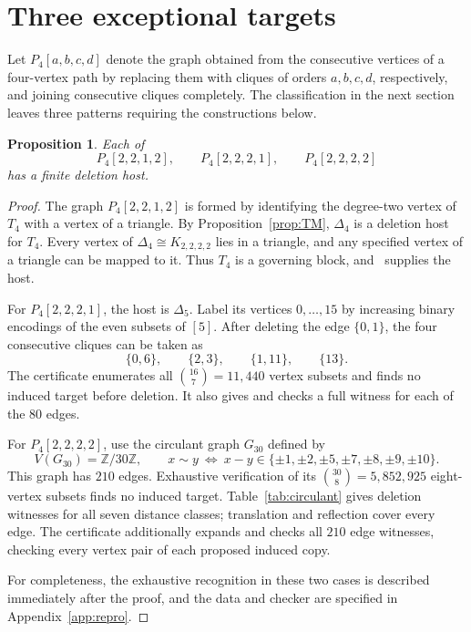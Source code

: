 \documentclass[11pt,reqno]{amsart}
\newtheorem{proposition}[theorem]{Proposition}
\theoremstyle{definition}
\theoremstyle{remark}
\begin{document}
\section{Three exceptional targets}\label{sec:exceptions}

Let $P_4[a,b,c,d]$ denote the graph obtained from the consecutive vertices of a four-vertex path by replacing them with cliques of orders $a,b,c,d$, respectively, and joining consecutive cliques completely. The classification in the next section leaves three patterns requiring the constructions below.

\begin{proposition}\label{prop:exceptions}
Each of
\[
 P_4[2,2,1,2],\qquad P_4[2,2,2,1],\qquad P_4[2,2,2,2]
\]
has a finite deletion host.
\end{proposition}
\begin{proof}
The graph $P_4[2,2,1,2]$ is formed by identifying the degree-two vertex of $T_4$ with a vertex of a triangle. By Proposition~\ref{prop:TM}, $\Delta_4$ is a deletion host for $T_4$. Every vertex of $\Delta_4\cong K_{2,2,2,2}$ lies in a triangle, and any specified vertex of a triangle can be mapped to it. Thus $T_4$ is a governing block, and~\cite[Theorem~4.1]{FHHS} supplies the host.

For $P_4[2,2,2,1]$, the host is $\Delta_5$. Label its vertices $0,\ldots,15$ by increasing binary encodings of the even subsets of $[5]$. After deleting the edge $\{0,1\}$, the four consecutive cliques can be taken as
\begin{equation}\label{eq:halfcube5-witness}
 \{0,6\},\qquad\{2,3\},\qquad\{1,11\},\qquad\{13\}.
\end{equation}
The certificate enumerates all $\binom{16}{7}=11,440$ vertex subsets and finds no induced target before deletion. It also gives and checks a full witness for each of the $80$ edges.

For $P_4[2,2,2,2]$, use the circulant graph $G_{30}$ defined by
\begin{equation}\label{eq:circulant}
 V(G_{30})=\mathbb Z/30\mathbb Z,\qquad
 x\sim y\ \Longleftrightarrow\ x-y\in
 \{\pm1,\pm2,\pm5,\pm7,\pm8,\pm9,\pm10\}.
\end{equation}
This graph has $210$ edges. Exhaustive verification of its $\binom{30}{8}=5,852,925$ eight-vertex subsets finds no induced target. Table~\ref{tab:circulant} gives deletion witnesses for all seven distance classes; translation and reflection cover every edge. The certificate additionally expands and checks all $210$ edge witnesses, checking every vertex pair of each proposed induced copy.

For completeness, the exhaustive recognition in these two cases is described immediately after the proof, and the data and checker are specified in Appendix~\ref{app:repro}.
\end{proof}
\end{document}
